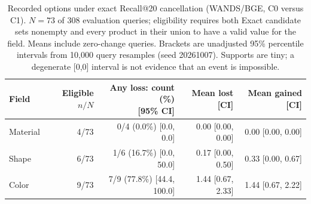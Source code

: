 \begin{table}[t]
\centering
\small
\begin{tabular}{@{}lrrrr@{}}
\toprule
Field & Eligible $n/N$ & \shortstack{Any loss: count (\%)\\{}[95\% CI]} & Mean lost [CI] & Mean gained [CI] \\
\midrule
Material & 4/73 & 0/4 (0.0\%) [0.0, 0.0] & 0.00 [0.00, 0.00] & 0.00 [0.00, 0.00] \\
Shape & 6/73 & 1/6 (16.7\%) [0.0, 50.0] & 0.17 [0.00, 0.50] & 0.33 [0.00, 0.67] \\
Color & 9/73 & 7/9 (77.8\%) [44.4, 100.0] & 1.44 [0.67, 2.33] & 1.44 [0.67, 2.22] \\
\bottomrule
\end{tabular}
\caption{Recorded options under exact Recall@20 cancellation (WANDS/BGE, C0 versus C1). $N=73$ of 308 evaluation queries; eligibility requires both Exact candidate sets nonempty and every product in their union to have a valid value for the field. Means include zero-change queries. Brackets are unadjusted 95\% percentile intervals from 10,000 query resamples (seed 20261007). Supports are tiny; a degenerate [0,0] interval is not evidence that an event is impossible.}
\label{tab:option-coverage-diagnostic}
\end{table}
